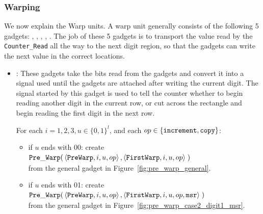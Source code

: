 \subsubsection{ Warping }

We now explain the Warp units. A warp unit generally consists of the following 5 gadgets: \prewarp,
\firstwarp, \warpbridge, \secondwarp, \postwarp. The job of these 5 gadgets is to transport the value
read by the {\tt Counter\_Read} all the way to the next digit region, so that the {\cwrite} gadgets
can write the next value in the correct locations.



    \begin{itemize}
        \item {\prewarp}: These gadgets take the bits read from the {\cread} gadgets and convert it into
                          a signal used until the {\dtop} gadgets are attached after writing the current digit.
                          The signal started by this gadget is used to tell the counter whether to begin reading
                          another digit in the current row, or cut across the rectangle and begin reading the
                          first digit in the next row.

            For each $i = 1,2,3, u \in \{0, 1\}^l$, and each $op \in \{ {\tt increment, copy } \}$:
            \begin{itemize}

            \item if $u$ ends with 00:
            create
            $\begin{aligned}[t]
                {\tt Pre\_Warp}(& \left\langle {\tt PreWarp},   i, u, op \right\rangle,
                           \left\langle {\tt FirstWarp}, i, u, op \right\rangle \;)
            \end{aligned}$ \\ from the general gadget in Figure~\ref{fig:pre_warp_general}.

            \item if $u$ ends with 01:
            create
            $\begin{aligned}[t]
                {\tt Pre\_Warp}(& \left\langle {\tt PreWarp},   i, u, op \right\rangle,
                           \left\langle {\tt FirstWarp}, i, u, op, {\tt msr} \right\rangle \;)
            \end{aligned}$ \\ from the general gadget in Figure~\ref{fig:pre_warp_case2_digit1_msr}.


\end{itemize}
\end{itemize}
